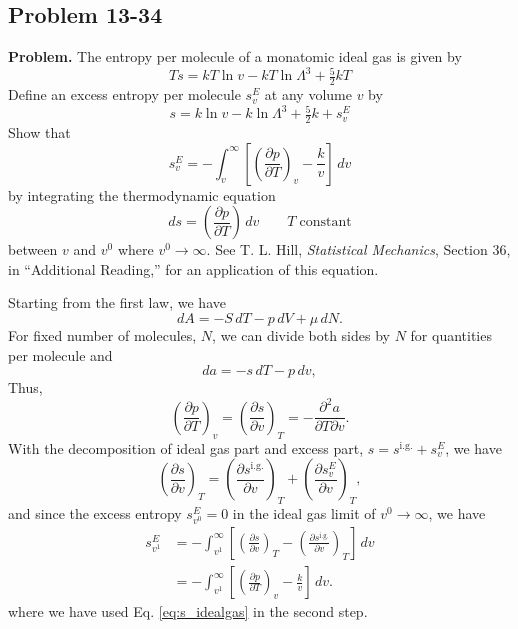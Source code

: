 \documentclass[twocolumn, 10pt]{article}
\numberwithin{equation}{section}
\newenvironment{problem}
{\par\medskip \color{problue}
  \textbf{Problem. }\ignorespaces}
{\medskip}
\newenvironment{solution}[1][\empty]
{\par\medskip\sffamily
  \textbf{\ifx\empty#1{Solution.}\relax\else{#1}\fi} \ignorespaces}
{\medskip}
\begin{document}
\subsection{Problem 13-34}

\begin{problem}
  The entropy per molecule of a monatomic ideal gas is given by
  \begin{equation}
  Ts = kT\ln v - kT \ln\Lambda^3 + \tfrac{5}{2}kT
    \label{eq:s_idealgas}
  \end{equation}
  Define an excess entropy per molecule $s_v^E$ at any volume $v$ by
  $$
  s = k \ln v - k \ln \Lambda^3 + \tfrac{5}{2}k + s_v^E
  $$
  Show that
  $$
  s_v^E = - \int_v^\infty \left[
    \left( \frac{ \partial p } { \partial T }
    \right)_v - \frac{k}{v} \right] \, dv
  $$
  by integrating the thermodynamic equation
  $$
  ds = \left(\frac{\partial p}{\partial T} \right) \, dv
  \qquad T \mathrm{\; constant}
  $$
  between $v$ and $v^0$ where $v^0 \to \infty$.
  See T. L. Hill, \textit{Statistical Mechanics},
  Section 36, in ``Additional Reading,''
  for an application of this equation.
\end{problem}

\begin{solution}
  Starting from the first law, we have
  $$
  dA = - S \, dT - p \, dV + \mu \, dN.
  $$
  For fixed number of molecules, $N$,
  we can divide both sides by $N$
  for quantities per molecule and
  $$
  da = - s \, dT - p \, dv,
  $$
  Thus,
  $$
  \left( \frac{ \partial p } { \partial T } \right)_v
  =
  \left( \frac{ \partial s } { \partial v } \right)_T
  =
  -\frac{ \partial^2 a } { \partial T \partial v}.
  $$
  With the decomposition of ideal gas part and excess part,
  $s = s^\mathrm{i.g.} + s_v^E$,
  we have
  $$
  \left( \frac{ \partial s } { \partial v } \right)_T
  =
  \left( \frac{ \partial s^\mathrm{i.g.} } { \partial v } \right)_T
  +
  \left( \frac{ \partial s_v^E } { \partial v } \right)_T
  ,
  $$
  and since the excess entropy $s_{v^0}^E = 0$
  in the ideal gas limit of $v^0 \to \infty$,
  we have
  \begin{align*}
    s_{v^1}^E
    &=
    -\int_{v^1}^\infty
     \left[
       \left( \frac{ \partial s } { \partial v } \right)_T
      -\left( \frac{ \partial s^\mathrm{i.g.} } { \partial v } \right)_T
     \right] \, dv
    \\
    &=
    -\int_{v^1}^\infty
     \left[
       \left( \frac{ \partial p } { \partial T } \right)_v
      -\frac{k}{v}
     \right] \, dv
    .
  \end{align*}
  where we have used Eq. \eqref{eq:s_idealgas}
  in the second step.

\end{solution}
\end{document}
